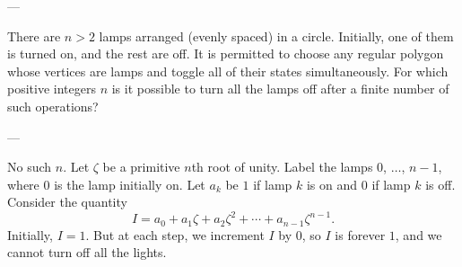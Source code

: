
---

There are $n>2$ lamps arranged (evenly spaced) in a circle. Initially, one of them is turned on, and the rest are off. It is permitted to choose any regular polygon whose vertices are lamps and toggle all of their states simultaneously. For which positive integers $n$ is it possible to turn all the lamps off after a finite number of such operations?

---

No such $n$. Let $\zeta$ be a primitive $n$th root of unity. Label the lamps $0$, $\ldots$, $n-1$, where $0$ is the lamp initially on. Let $a_k$ be $1$ if lamp $k$ is on and $0$ if lamp $k$ is off. Consider the quantity \[I=a_0+a_1\zeta+a_2\zeta^2+\cdots+a_{n-1}\zeta^{n-1}.\]
Initially, $I=1$. But at each step, we increment $I$ by $0$, so $I$ is forever $1$, and we cannot turn off all the lights.



